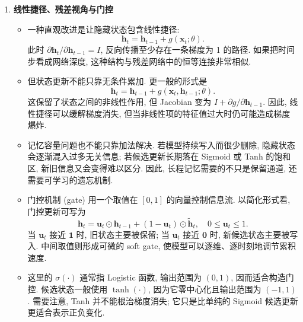 \documentclass{../nndlcourse}
\begin{document}
\begin{enumerate}

\item \textbf{线性捷径、残差视角与门控}
  \begin{itemize}
    \item 一种直观改进是让隐藏状态包含线性捷径:
    \begin{equation*}
      \boldsymbol{h}_t = \boldsymbol{h}_{t-1} + g(\boldsymbol{x}_t;\theta).
    \end{equation*}
    此时 $\partial \boldsymbol{h}_t/\partial \boldsymbol{h}_{t-1}=I$, 反向传播至少存在一条梯度为 1 的路径. 如果把时间步看成网络深度, 这种结构与残差网络中的恒等连接非常相似.
    \item 但状态更新不能只靠无条件累加. 更一般的形式是
    \begin{equation*}
      \boldsymbol{h}_t = \boldsymbol{h}_{t-1}
      + g(\boldsymbol{x}_t,\boldsymbol{h}_{t-1};\theta).
    \end{equation*}
    这保留了状态之间的非线性作用, 但 Jacobian 变为 $I+\partial g/\partial \boldsymbol{h}_{t-1}$. 因此, 线性捷径可以缓解梯度消失, 但当非线性项的特征值过大时仍可能造成梯度爆炸.
    \item 记忆容量问题也不能只靠加法解决. 若模型持续写入而很少删除, 隐藏状态会逐渐混入过多无关信息; 若候选更新长期落在 Sigmoid 或 Tanh 的饱和区, 新旧信息又会变得难以区分. 因此, 长程记忆需要的不只是保留通道, 还需要可学习的遗忘机制.
    \item 门控机制 (gate) 用一个取值在 $[0,1]$ 的向量控制信息流. 以简化形式看, 门控更新可写为
    \begin{equation*}
      \boldsymbol{h}_t
      = \boldsymbol{u}_t \odot \boldsymbol{h}_{t-1}
      + (1-\boldsymbol{u}_t)\odot \tilde{\boldsymbol{h}}_t,
      \quad 0 \le \boldsymbol{u}_t \le 1.
    \end{equation*}
    当 $\boldsymbol{u}_t$ 接近 $\mathbf{1}$ 时, 旧状态主要被保留; 当 $\boldsymbol{u}_t$ 接近 $\boldsymbol{0}$ 时, 新候选状态主要被写入. 中间取值则形成可微的 soft gate, 使模型可以逐维、逐时刻地调节累积速度.
    \item 这里的 $\sigma(\cdot)$ 通常指 Logistic 函数, 输出范围为 $(0,1)$, 因而适合构造门控. 候选状态一般使用 $\tanh(\cdot)$, 因为它零中心化且输出范围为 $(-1,1)$. 需要注意, Tanh 并不能根治梯度消失; 它只是比单纯的 Sigmoid 候选更新更适合表示正负变化.
  \end{itemize}


\end{enumerate}
\end{document}
